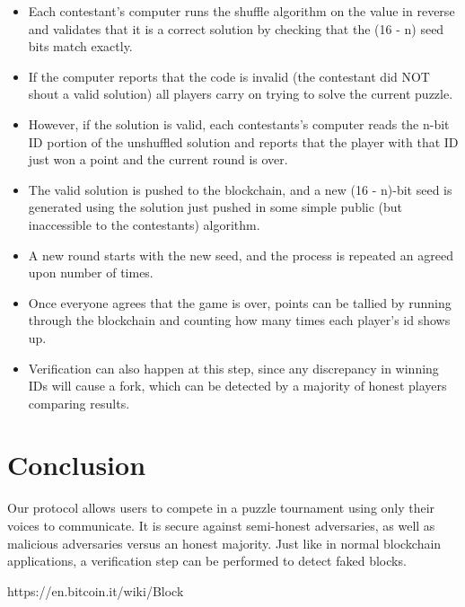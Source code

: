 \documentclass[leqno,12pt]{article}
\begin{document}
\begin{itemize}
\item Each contestant’s computer runs the shuffle algorithm on the value in reverse and validates that it is a correct solution by checking that the (16 - n) seed bits match exactly.
\item If the computer reports that the code is invalid (the contestant did NOT shout a valid solution) all players carry on trying to solve the current puzzle.
\item However, if the solution is valid, each contestants’s computer reads the n-bit ID portion of the unshuffled solution and reports that the player with that ID just won a point and the current round is over.
\item The valid solution is pushed to the blockchain, and a new (16 - n)-bit seed is generated using the solution just pushed in some simple public (but inaccessible to the contestants) algorithm.
\item A new round starts with the new seed, and the process is repeated an agreed upon number of times.
\item Once everyone agrees that the game is over, points can be tallied by running through the blockchain and counting how many times each player’s id shows up.
\item Verification can also happen at this step, since any discrepancy in winning IDs will cause a fork, which can be detected by a majority of honest players comparing results.
\end{itemize}

\section{Conclusion}
Our protocol allows users to compete in a puzzle tournament using only their voices to communicate. It is secure against semi-honest adversaries, as well as malicious adversaries versus an honest majority. Just like in normal blockchain applications, a verification step can be performed to detect faked blocks.

\begin{thebibliography}{9}
   https://en.bitcoin.it/wiki/Block
\end{thebibliography}
\end{document}
